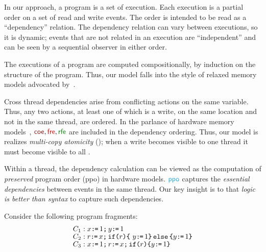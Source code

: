 In our approach, a program is a set of execution.  Each execution is a
partial order on a set of read and write events.  The order is intended to be
read as a ``dependency'' relation.  The dependency relation can vary between
executions, so it is dynamic; events that are not related in an execution are
``independent'' and can be seen by a sequential observer in either order.

The executions of a program are computed compositionally, by induction on the
structure of the program.  Thus, our model falls into the style of relaxed
memory models advocated by~\citet{Batty17}.

Cross thread dependencies arise from conflicting actions on the same
variable.  Thus, any two actions, at least one of which is a write, on the
same location and not in the same thread, are ordered.  In the parlance of
hardware memory models~\citep{alglave}, $\rcoe,\rfre,\rrfe$ are included in
the dependency ordering.  Thus, our model is realizes \emph{multi-copy
  atomicity} (\mca); when a write becomes visible to one thread it must
become visible to all
\citep{DBLP:journals/pacmpl/PulteFDFSS18}.
  

Within a thread, the dependency calculation can be viewed as the computation
of \emph{preserved} program order (\textsf{ppo}) in hardware models.  $\rppo$
captures the \emph{essential dependencies} between events in the same thread.
Our key insight is to that \emph{logic is better than syntax} to capture such
dependencies.

Consider the following program fragments: \begingroup \allowdisplaybreaks
\begin{align*}
  & C_1: x \texttt{:}\mkern-1mu\texttt{=}\, 1 \texttt{;}\,\allowbreak y \texttt{:}\mkern-1mu\texttt{=}\, 1
  \\[-1ex] & C_2: r \texttt{:}\mkern-1mu\texttt{=}\, x \texttt{;}\,\allowbreak \texttt{if}\allowbreak\texttt{(}r\texttt{)} \allowbreak\texttt{\{}\ y \texttt{:}\mkern-1mu\texttt{=}\, 1 \texttt{\}}\,\allowbreak\texttt{else}\allowbreak\,\texttt{\{} y \texttt{:}\mkern-1mu\texttt{=}\, 1  \texttt{\}}
  \\[-1ex] & C_3: x \texttt{:}\mkern-1mu\texttt{=}\, 1 \texttt{;}\,\allowbreak r \texttt{:}\mkern-1mu\texttt{=}\, x \texttt{;}\,\allowbreak \texttt{if}\allowbreak\texttt{(}r\texttt{)} \allowbreak\texttt{\{} y \texttt{:}\mkern-1mu\texttt{=}\, 1 \texttt{\}}
\end{align*}
\endgroup

